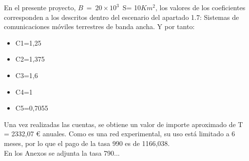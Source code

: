 En el presente proyecto, $B\ =\ 20 \times 10^3$\, S= 10$Km^2$, los valores de los coeficientes corresponden a los descritos dentro del escenario del apartado 1.7: Sistemas de comunicaciones móviles terrestres de banda ancha. Y por tanto: 
\begin{itemize}
\item C1=1,25
\item C2=1,375
\item C3=1,6
\item C4=1
\item C5=0,7055
\end{itemize}

Una vez realizadas las cuentas, se obtiene un valor de importe aproximado de T = 2332,07 \euro{} anuales. Como es una red experimental, su uso está limitado a 6 meses, por lo que el pago de la tasa 990 es de 1166,038. \\

En los Anexos se adjunta la tasa 790...
